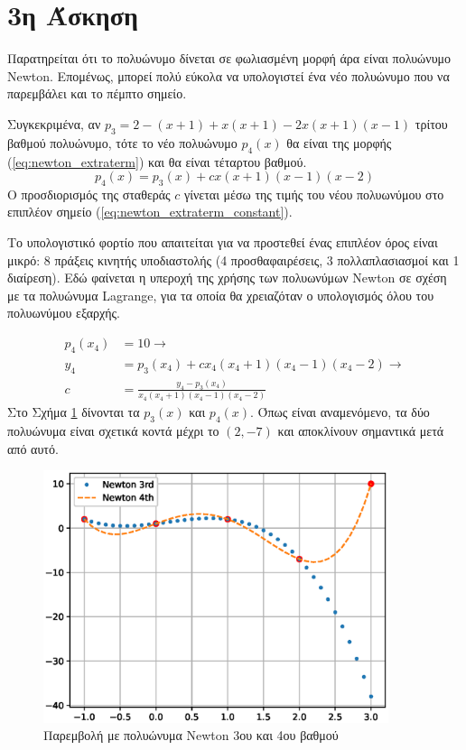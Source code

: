\documentclass[assignment3.tex]{subfiles}
\begin{document}
\section*{3η Άσκηση}
Παρατηρείται ότι το πολυώνυμο δίνεται σε φωλιασμένη μορφή άρα είναι πολυώνυμο \textlatin{Newton}. Επομένως, μπορεί πολύ εύκολα να υπολογιστεί ένα νέο πολυώνυμο που να παρεμβάλει και το πέμπτο σημείο.

Συγκεκριμένα, αν $p_3=2-(x+1)+x(x+1)-2x(x+1)(x-1)$ τρίτου βαθμού πολυώνυμο, τότε το νέο πολυώνυμο $p_4(x)$ θα είναι της μορφής (\ref{eq:newton_extraterm}) και θα είναι τέταρτου βαθμού. 
\begin{equation}
p_4(x) = p_3(x) + cx(x+1)(x-1)(x-2)
\label{eq:newton_extraterm}
\end{equation}
Ο προσδιορισμός της σταθεράς $c$ γίνεται μέσω της τιμής του νέου πολυωνύμου στο επιπλέον σημείο (\ref{eq:newton_extraterm_constant}). 

Το υπολογιστικό φορτίο που απαιτείται για να προστεθεί ένας επιπλέον όρος είναι μικρό: 8 πράξεις κινητής υποδιαστολής (4 προσθαφαιρέσεις, 3 πολλαπλασιασμοί και 1 διαίρεση). Εδώ φαίνεται η υπεροχή της χρήσης των πολυωνύμων \textlatin{Newton} σε σχέση με τα πολυώνυμα \textlatin{Lagrange}, για τα οποία θα χρειαζόταν ο υπολογισμός όλου του πολυωνύμου εξαρχής.

\begin{equation}
\begin{split}
p_4(x_4) &= 10 \rightarrow \\
 y_4 &= p_3(x_4) + cx_4(x_4+1)(x_4-1)(x_4-2) \rightarrow \\
 c &= \frac{y_4-p_3(x_4)}{x_4(x_4+1)(x_4-1)(x_4-2)}
\end{split}
\label{eq:newton_extraterm_constant}
\end{equation}
Στο Σχήμα \ref{fig:ex3} δίνονται τα $p_3(x)$ και $p_4(x)$. Όπως είναι αναμενόμενο, τα δύο πολυώνυμα είναι σχετικά κοντά μέχρι το $(2,-7)$ και αποκλίνουν σημαντικά μετά από αυτό.

\begin{figure}[hp]
	\includegraphics[width=0.9\textwidth]{ex3.eps}
	\centering
	\caption{Παρεμβολή με πολυώνυμα \textlatin{Newton} 3ου και 4ου βαθμού}
	\label{fig:ex3}
\end{figure}
\end{document}
